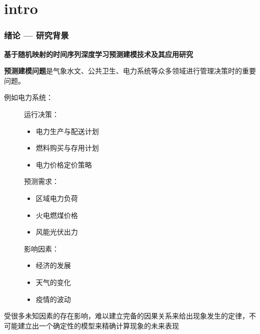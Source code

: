 \section{intro}

\begin{frame}
    \frametitle{绪论 — 研究背景}

    \textbf{基于随机映射的时间序列深度学习预测建模技术及其应用研究}

    \vspace*{1em}
    \textbf{预测建模问题}是气象水文、公共卫生、电力系统等众多领域进行管理决策时的重要问题。

    例如电力系统：
    \begin{figure}
        \begin{minipage}[b]{0.32\textwidth}
            运行决策：
            \begin{itemize}
                \item 电力生产与配送计划
                \item 燃料购买与存用计划
                \item 电力价格定价策略
            \end{itemize}
        \end{minipage}
        \hspace{1em}
        \begin{minipage}[b]{0.32\textwidth}
            预测需求：
            \begin{itemize}
                \item 区域电力负荷
                \item 火电燃煤价格
                \item 风能光伏出力
            \end{itemize}
        \end{minipage}
        \hfill
        \begin{minipage}[b]{0.3\textwidth}
            影响因素：
            \begin{itemize}
                \item 经济的发展
                \item 天气的变化
                \item 疫情的波动
            \end{itemize}
        \end{minipage}
    \end{figure}

    受很多未知因素的存在影响，难以建立完备的因果关系来给出现象发生的定律，不可能建立出一个确定性的模型来精确计算现象的未来表现

\end{frame}
